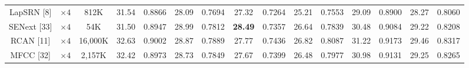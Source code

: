 \documentclass{ieeeaccess}
\begin{document}
\begin{table}
\begin{tabular}{|c|c|c|cc|cc|cc|cc|cc|cc|}
LapSRN [8] & $\times4$ &812K& \multicolumn{1}{c|}{31.54} &0.8866 & \multicolumn{1}{c|}{28.09} &0.7694  &\multicolumn{1}{c|}{27.32} &0.7264  & \multicolumn{1}{c|}{25.21 } &0.7553   & \multicolumn{1}{c|}{29.09 } &0.8900
&\multicolumn{1}{c|}{28.27 } &0.8060 \\

SENext [33] & $\times4$  &54K& \multicolumn{1}{c|}{31.50} &0.8947  & \multicolumn{1}{c|}{28.99} &{0.7812}  & \multicolumn{1}{c|}{\color{red}\textbf{28.49}} &{0.7357} & \multicolumn{1}{c|}{26.64 } &{0.7839}  & \multicolumn{1}{c|}{30.48} &{0.9084}
&\multicolumn{1}{c|}{29.22} &{0.8208}    \\


RCAN [11]& $\times4$ &16,000K & \multicolumn{1}{c|}{32.63} &0.9002 & \multicolumn{1}{c|}{28.87} & 0.7889&\multicolumn{1}{c|}{27.77} &0.7436 & \multicolumn{1}{c|}{26.82} &0.8087 & \multicolumn{1}{c|}{31.22 } & 0.9173
&\multicolumn{1}{c|}{29.46} &0.8317 \\


MFCC [32]& $\times 4$&2,157K& \multicolumn{1}{c|}{32.42} & 0.8973 & \multicolumn{1}{c|}{28.73} &0.7849 &\multicolumn{1}{c|}{27.67} & 0.7399 & \multicolumn{1}{c|}{26.48} &0.7977 & \multicolumn{1}{c|}{30.98} & 0.9131
&\multicolumn{1}{c|}{29.25} & 0.8265\\




\end{tabular}
\end{table}
\end{document}
